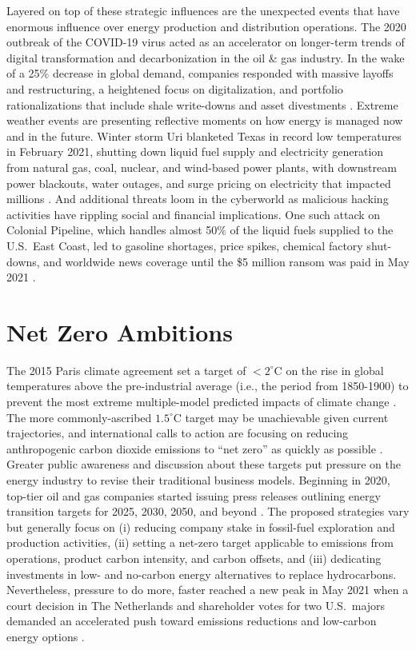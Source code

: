 Layered on top of these strategic influences are the unexpected events that have enormous influence over energy production and distribution operations. The 2020 outbreak of the COVID-19 virus acted as an accelerator on longer-term trends of digital transformation and decarbonization in the oil \& gas industry. In the wake of a 25\% decrease in global demand, companies responded with massive layoffs and restructuring, a heightened focus on digitalization, and portfolio rationalizations that include shale write-downs and asset divestments \citep{deloitte_2021_2020}. Extreme weather events are presenting reflective moments on how energy is managed now and in the future. Winter storm Uri blanketed Texas in record low temperatures in February 2021, shutting down liquid fuel supply and electricity generation from natural gas, coal, nuclear, and wind-based power plants, with downstream power blackouts, water outages, and surge pricing on electricity that impacted millions \citep{harc_winter_2021,lazard_lazards_2020}. And additional threats loom in the cyberworld as malicious hacking activities have rippling social and financial implications. One such attack on Colonial Pipeline, which handles almost 50\% of the liquid fuels supplied to the U.S.\ East Coast, led to gasoline shortages, price spikes, chemical factory shut-downs, and worldwide news coverage until the \$5 million ransom was paid in May 2021 \citep{sanger_pipeline_2021}.

\section{Net Zero Ambitions}\label{ch1:netzero}
The 2015 Paris climate agreement set a target of $<2^\circ$C on the rise in global temperatures above the pre-industrial average (i.e., the period from 1850-1900) to prevent the most extreme multiple-model predicted impacts of climate change \citep{unfccc_paris_2015}. The more commonly-ascribed $1.5^\circ$C target may be unachievable given current trajectories, and international calls to action are focusing on reducing anthropogenic carbon dioxide emissions to ``net zero'' as quickly as possible \citep{ipcc_global_2018}. Greater public awareness and discussion about these targets put pressure on the energy industry to revise their traditional business models. Beginning in 2020, top-tier oil and gas companies started issuing press releases outlining energy transition targets for 2025, 2030, 2050, and beyond \citep{bp_international_2020,chevron_chevron_2021,conocophillips_conocophillips_2020,equinor_equinor_2020,exxonmobil_exxonmobil_2021,shell_responsible_2020,shell_shell_2021,total_total_2020,total_2020_2021}. The proposed strategies vary but generally focus on (i) reducing company stake in fossil-fuel exploration and production activities, (ii) setting a net-zero target applicable to emissions from operations, product carbon intensity, and carbon offsets, and (iii) dedicating investments in low- and no-carbon energy alternatives to replace hydrocarbons. Nevertheless, pressure to do more, faster reached a new peak in May 2021 when a court decision in The Netherlands and shareholder votes for two U.S.\ majors demanded an accelerated push toward emissions reductions and low-carbon energy options \citep{mcwilliams_investors_2021}.

